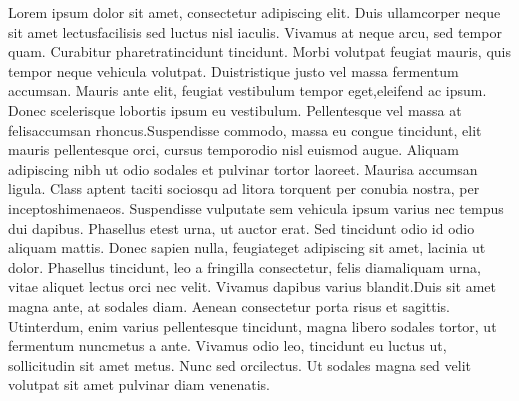\documentclass[
	letterpaper,
	 subsectioncolor=orange,
	itemtextcolor=charcoal,
	titletextcolor=arsenic,
	sidebarwidth=0.28\paperwidth,
	topbottommargin=0.03\paperheight,
	leftrightmargin=20pt,
]{clsFiles/fortysecondscv}
\begin{document}
\vspace*{2.5em}
\makebacksidebar
{}

Lorem ipsum dolor sit amet, consectetur adipiscing elit. Duis ullamcorper neque sit amet lectusfacilisis sed luctus nisl iaculis. Vivamus at neque arcu, sed tempor quam. Curabitur pharetratincidunt tincidunt. Morbi volutpat feugiat mauris, quis tempor neque vehicula volutpat. Duistristique justo vel massa fermentum accumsan. Mauris ante elit, feugiat vestibulum tempor eget,eleifend ac ipsum. Donec scelerisque lobortis ipsum eu vestibulum. Pellentesque vel massa at felisaccumsan rhoncus.Suspendisse commodo, massa eu congue tincidunt, elit mauris pellentesque orci, cursus temporodio nisl euismod augue. Aliquam adipiscing nibh ut odio sodales et pulvinar tortor laoreet. Maurisa accumsan ligula. Class aptent taciti sociosqu ad litora torquent per conubia nostra, per inceptoshimenaeos. Suspendisse vulputate sem vehicula ipsum varius nec tempus dui dapibus. Phasellus etest urna, ut auctor erat. Sed tincidunt odio id odio aliquam mattis. Donec sapien nulla, feugiateget adipiscing sit amet, lacinia ut dolor. Phasellus tincidunt, leo a fringilla consectetur, felis diamaliquam urna, vitae aliquet lectus orci nec velit. Vivamus dapibus varius blandit.Duis sit amet magna ante, at sodales diam. Aenean consectetur porta risus et sagittis. Utinterdum, enim varius pellentesque tincidunt, magna libero sodales tortor, ut fermentum nuncmetus a ante. Vivamus odio leo, tincidunt eu luctus ut, sollicitudin sit amet metus. Nunc sed orcilectus. Ut sodales magna sed velit volutpat sit amet pulvinar diam venenatis.
\end{document}
